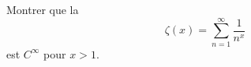 \begin{exercice}\label{exo_I-1-11}

Montrer que la 
\begin{equation}
	\zeta(x)=\sum_{n=1}^{\infty}\frac{1}{ n^x }
\end{equation}
est $C^{\infty}$ pour $x>1$.

\end{exercice}


